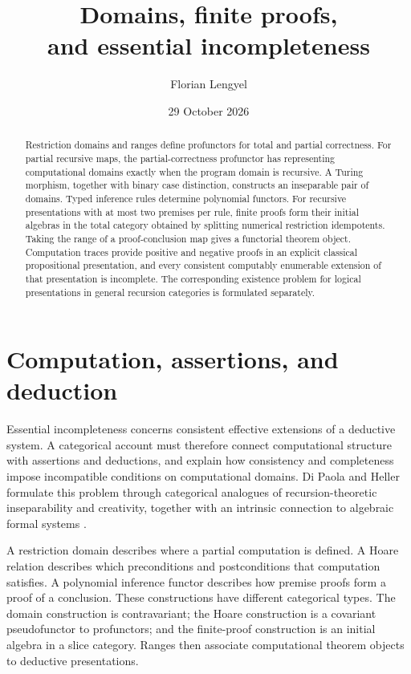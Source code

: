 \documentclass[11pt]{article}
\title{Domains, finite proofs,\\and essential incompleteness}
\author{Florian Lengyel}
\date{29 October 2026}
\theoremstyle{definition}
\theoremstyle{remark}
\begin{document}
\maketitle
\begin{abstract}
Restriction domains and ranges define profunctors for total and partial
correctness. For partial recursive maps, the partial-correctness profunctor
has representing computational domains exactly when the program domain is
recursive. A Turing morphism, together with binary case distinction,
constructs an inseparable pair of domains. Typed inference rules determine
polynomial functors. For recursive presentations with at most two premises
per rule, finite proofs form their initial algebras in the total category
obtained by splitting numerical restriction idempotents.
Taking the range of a proof-conclusion map gives a functorial theorem
object. Computation traces provide positive and negative proofs in an
explicit classical propositional presentation, and every consistent
computably enumerable extension of that presentation is incomplete.
The corresponding existence problem for logical presentations in general
recursion categories is formulated separately.
\end{abstract}
\tableofcontents

\section{Computation, assertions, and deduction}
Essential incompleteness concerns consistent effective extensions of a
deductive system. A categorical account must therefore connect computational
structure with assertions and deductions, and explain how consistency and
completeness impose incompatible conditions on computational domains.
Di Paola and Heller formulate this problem through categorical analogues of
recursion-theoretic inseparability and creativity, together with an intrinsic
connection to algebraic formal systems \cite[\S1]{DPH}.

A restriction domain describes where a partial computation is defined.
A Hoare relation describes which preconditions and postconditions that
computation satisfies. A polynomial inference functor describes how
premise proofs form a proof of a conclusion. These constructions have
different categorical types. The domain construction is contravariant;
the Hoare construction is a covariant pseudofunctor to profunctors; and
the finite-proof construction is an initial algebra in a slice category.
Ranges then associate computational theorem objects to deductive
presentations.
\end{document}
